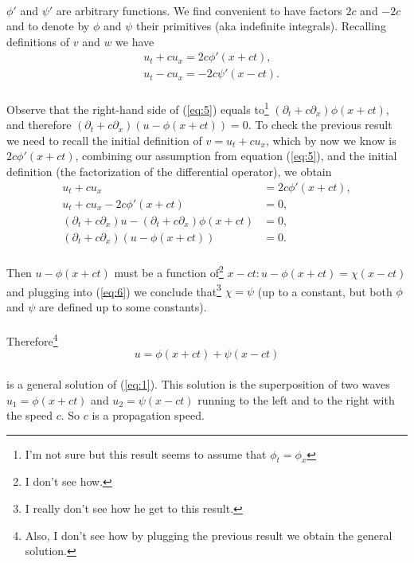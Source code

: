 \documentclass{article}
\begin{document}
\paragraph{}$\phi'$ and $\psi'$ are arbitrary functions. We find convenient to have factors $2c$ and $-2c$ and to denote by $\phi$ and $\psi$ their primitives (aka indefinite integrals). Recalling definitions of $v$ and $w$ we have
\begin{align*}
&u_t+cu_x=2c\phi'(x+ct),\\
&u_t-cu_x=-2c\psi'(x-ct).
\end{align*}
\paragraph{}Observe that the right-hand side of (\ref{eq:5}) equals to\footnote{I'm not sure but this result seems to assume that $\phi_t = \phi_x$} $(\partial_t + c\partial_x)\phi(x + ct)$, and therefore $(\partial_t +c\partial_x)(u-\phi(x+ct))=0$. To check the previous result we need to recall the initial definition of $v = u_t + cu_x$, which by now we know is $2c\phi'(x+ct)$, combining our assumption from equation (\ref{eq:5}), and the initial definition (the factorization of the differential operator), we obtain
\begin{align*}
	u_t + cu_x &= 2c\phi'(x + ct),\\
	u_t + cu_x - 2c\phi'(x + ct) &= 0,\\
	(\partial_t + c\partial_x)u - (\partial_t + c\partial_x)\phi(x + ct) &= 0,\\
	(\partial_t + c\partial_x)(u-\phi(x + ct)) &= 0.
\end{align*}
\paragraph{}Then $u-\phi(x+ct)$ must be a function of\footnote{I don't see how.} $x-ct: u-\phi(x+ct)=\chi(x-ct)$ and plugging into (\ref{eq:6}) we conclude that\footnote{I really don't see how he get to this result.} $\chi=\psi$ (up to a constant, but both $\phi$ and $\psi$ are defined up to some constants).
\paragraph{}Therefore\footnote{Also, I don't see how by plugging the previous result we obtain the general solution.}
\begin{equation}
	u = \phi(x + ct) + \psi(x - ct)\label{eq:7}
\end{equation}
\paragraph{} is a general solution of (\ref{eq:1}). This solution is the superposition of two waves $u_1 = \phi(x + ct)$ and $u_2 = \psi(x - ct)$ running to the left and to the right with the speed $c$. So $c$ is a propagation speed. 
\end{document}
